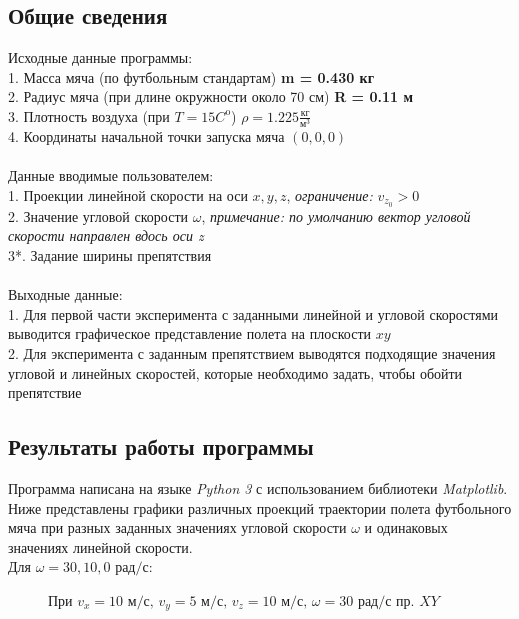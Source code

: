 \documentclass[a5paper, 10pt]{article}
\theoremstyle{definition}
\theoremstyle{plain}
\theoremstyle{remark}
\begin{document}
\subsection{Общие сведения}
Исходные данные программы:\\
1. Масса мяча (по футбольным стандартам) \textbf{m = 0.430 кг}\\
2. Радиус мяча (при длине окружности около 70 см)  \textbf{R = 0.11 м}\\
3. Плотность воздуха (при $T = 15 C^{\text{o}}$) $\rho = 1.225 \frac{\text{кг}}{\text{м}^3}$\\
4. Координаты начальной точки запуска мяча $(0, 0, 0)$\\\\
Данные вводимые пользователем:\\
1. Проекции линейной скорости на оси $x, y, z$, \textit{ограничение: }  $v_{z_{0}} > 0$\\
2. Значение угловой скорости $\omega$, \textit{ примечание: по умолчанию вектор угловой скорости направлен вдось оси z }\\
3*. Задание ширины препятствия\\\\
Выходные данные:\\
1. Для первой части эксперимента с заданными линейной и угловой скоростями выводится графическое представление полета на плоскости $xy$\\
2. Для эксперимента с заданным препятствием выводятся подходящие значения угловой и линейных скоростей, которые необходимо задать, чтобы обойти препятствие\\


\subsection{Результаты работы программы}
Программа написана на языке \textit{Python 3} с использованием библиотеки \textit{Matplotlib}. \\
Ниже представлены графики различных проекций траектории полета футбольного мяча при разных заданных значениях угловой скорости $\omega$ и одинаковых значениях линейной скорости.\\
Для $\omega = 30, 10, 0  \text{ рад/с} $:
\begin{figure}[!h]
	           \caption{При $v_x = 10 \text{ м/с}, \, v_y = 5  \text{ м/с}, \, v_z = 10  \text{ м/с}, \, \omega = 30 \text{ рад/с}$ пр. $XY$}
\end{figure}
\end{document}
